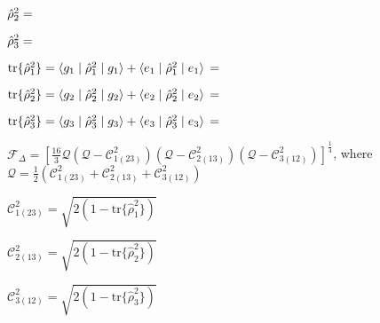 \documentclass{article}
\theoremstyle{definition}
\begin{document}
$\hat{\rho}_{2}^{2} =\\
$

$\hat{\rho}_{3}^{2} =\\
$

$\mathrm{tr} \{ \hat{\rho}_{1}^{2} \} = \braket{g_{1} \mid \hat{\rho}_{1}^{2} \mid g_{1}} + \braket{e_{1} \mid \hat{\rho}_{1}^{2} \mid e_{1}}\\
= $

$\mathrm{tr} \{ \hat{\rho}_{2}^{2} \} = \braket{g_{2} \mid \hat{\rho}_{2}^{2} \mid g_{2}} + \braket{e_{2} \mid \hat{\rho}_{2}^{2} \mid e_{2}}\\
= $

$\mathrm{tr} \{ \hat{\rho}_{3}^{2} \} = \braket{g_{3} \mid \hat{\rho}_{3}^{2} \mid g_{3}} + \braket{e_{3} \mid \hat{\rho}_{3}^{2} \mid e_{3}}\\
= $

$\mathscr{F}_{\Delta} = [\frac{16}{3} \mathscr{Q} (\mathscr{Q} - \mathscr{C}_{1(23)}^{2}) (\mathscr{Q} - \mathscr{C}_{2(13)}^{2}) (\mathscr{Q} - \mathscr{C}_{3(12)}^{2})]^{\frac{1}{4}}$, where $\mathscr{Q} = \frac{1}{2}(\mathscr{C}_{1(23)}^{2} + \mathscr{C}_{2(13)}^{2} + \mathscr{C}_{3(12)}^{2})$

$\mathscr{C}_{1(23)}^{2} = \sqrt{2(1 - \mathrm{tr} \{ \hat{\rho}_{1}^{2} \} )}$

$\mathscr{C}_{2(13)}^{2} = \sqrt{2(1 - \mathrm{tr} \{ \hat{\rho}_{2}^{2} \} )}$

$\mathscr{C}_{3(12)}^{2} = \sqrt{2(1 - \mathrm{tr} \{ \hat{\rho}_{3}^{2} \} )}$
\end{document}
